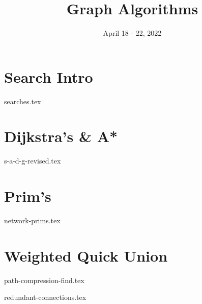 \documentclass[11pt]{exam}
\title{Graph Algorithms}
\date{April 18 - 22, 2022}
\begin{document}
\maketitle

\section{Search Intro}
\begin{questions}
{searches.tex}
\end{questions}
\pagebreak

\section{Dijkstra's \& A*}
\begin{questions}
{s-a-d-g-revised.tex}

\end{questions}

\pagebreak
\section{Prim's}
\begin{questions}
{network-prims.tex}
\end{questions}
\pagebreak

\vspace{25mm}

\newpage
\section{Weighted Quick Union}
\begin{questions}
{path-compression-find.tex}

{redundant-connections.tex}
\end{questions}
\end{document}
